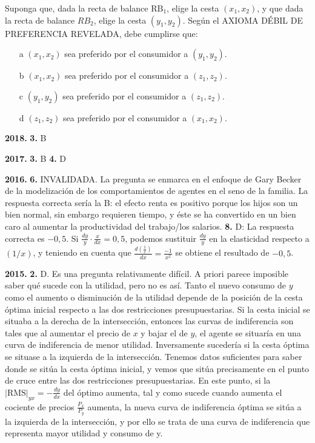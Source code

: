 \documentclass{nuevotema}
\begin{document}
Suponga que, dada la recta de balance $\text{RB}_1$, elige la cesta $(x_1, x_2)$, y que dada la recta de balance $RB_2$, elige la cesta $(y_1, y_2)$. Según el AXIOMA DÉBIL DE PREFERENCIA REVELADA, debe cumplirse que:
\begin{enumerate}
    \item[a] $(x_1, x_2)$ sea preferido por el consumidor a $(y_1, y_2)$.
    \item[b] $(x_1, x_2)$ sea preferido por el consumidor a $(z_1, z_2)$.
    \item[c] $(y_1, y_2)$ sea preferido por el consumidor a $(z_1, z_2)$.
    \item[d] $(z_1, z_2)$ sea preferido por el consumidor a $(x_1, x_2)$.
\end{enumerate}

\notas

\textbf{2018.} \textbf{3.} B

\textbf{2017.} \textbf{3.} B \textbf{4.} D

\textbf{2016.} \textbf{6.} INVALIDADA. La pregunta se enmarca en el enfoque de Gary Becker de la modelización de los comportamientos de agentes en el seno de la familia. La respuesta correcta sería la B: el efecto renta es positivo porque los hijos son un bien normal, sin embargo requieren tiempo, y éste se ha convertido en un bien caro al aumentar la productividad del trabajo/los salarios. \textbf{8.} D: La respuesta correcta es $-0,5$. Si $\frac{dy}{y} \cdot \frac{x}{dx} = 0,5$, podemos sustituir $\frac{dy}{y}$ en la elasticidad respecto a $(1/x)$, y teniendo en cuenta que $\frac{d(\frac{1}{x})}{dx} = \frac{-1}{x^2}$ se obtiene el resultado de $-0,5$.

\textbf{2015.} \textbf{2.} D. Es una pregunta relativamente difícil. A priori parece imposible saber qué sucede con la utilidad, pero no es así. Tanto el nuevo consumo de $y$ como el aumento o disminución de la utilidad depende de la posición de la cesta óptima inicial respecto a las dos restricciones presupuestarias. Si la cesta inicial se situaba a la derecha de la intersección, entonces las curvas de indiferencia son tales que al aumentar el precio de $x$ y bajar el de $y$, el agente se situaría en una curva de indiferencia de menor utilidad. Inversamente sucedería si la cesta óptima se situase a la izquierda de la intersección. Tenemos datos suficientes para saber donde se sitúa la cesta óptima inicial, y vemos que sitúa precisamente en el punto de cruce entre las dos restricciones presupuestarias. En este punto, si la $|\text{RMS}|_{yx} = -\frac{dy}{dx}$ del óptimo aumenta, tal y como sucede cuando aumenta el cociente de precios $\frac{P_x}{P_y}$ aumenta, la nueva curva de indiferencia óptima se sitúa a la izquierda de la intersección, y por ello se trata de una curva de indiferencia que representa mayor utilidad y consumo de y.
\end{document}
